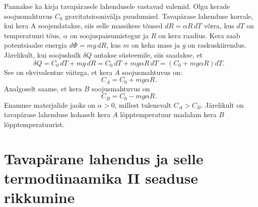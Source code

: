 \documentclass{trkut}%
\begin{document}
Pannakse ka kirja tavapärasele lahendusele vastavad valemid. Olgu kerade soojusmahtuvus $C_0$ gravitatsioonivälja puudumisel. Tavapärase lahenduse korrale, kui kera A soojendatakse, siis selle massikese tõused $dR=\alpha R \, dT$ võrra, kus $dT$ on temperatuuri tõus, $\alpha$ on soojuspaisumistegur ja $R$ on kera raadius. Kera saab potentsiaalse energia $d\Phi = mg \, dR$, kus $m$ on keha mass ja $g$ on raskuskiirendus. Järelikult, kui soojushulk \(\delta Q\) antakse süsteemile, siis saadakse, et 
\begin{equation}
    \delta Q = C_0 \, dT + mg \, dR = C_0 \, dT + mg\alpha R \, dT = (C_0 +  mg\alpha R) dT.       
\end{equation}
See on ekvivalentne väitega, et kera \(A\) soojusmahtuvus on:
\begin{equation}
    C_A = C_0 + mg\alpha R.
\end{equation}
Analgoselt saame, et kera \(B\) soojusmahtuvus on 
\begin{equation}
    C_B = C_0 - mg\alpha R.
\end{equation}
Enamuse materjalide jaoks on \(\alpha > 0\), millest tulenevalt \(C_A>C_B\). Järelikult on tavapärase lahenduse kohaselt kera \(A\) lõpptemperatuur madalam kera \(B\) lõpptemperatuurist. 

\section{Tavapärane lahendus ja selle termodünaamika II seaduse rikkumine}
\end{document}
